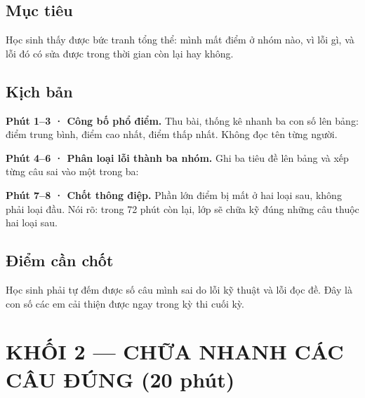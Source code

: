 \documentclass[11pt, a4paper]{article}
\begin{document}
\subsection{Mục tiêu}

Học sinh thấy được bức tranh tổng thể: mình mất điểm ở nhóm nào, vì lỗi gì, và lỗi đó có sửa được trong thời gian còn lại hay không.

\subsection{Kịch bản}

\textbf{Phút 1–3 · Công bố phổ điểm.} Thu bài, thống kê nhanh ba con số lên bảng: điểm trung bình, điểm cao nhất, điểm thấp nhất. Không đọc tên từng người.

\textbf{Phút 4–6 · Phân loại lỗi thành ba nhóm.} Ghi ba tiêu đề lên bảng và xếp từng câu sai vào một trong ba:


\textbf{Phút 7–8 · Chốt thông điệp.} Phần lớn điểm bị mất ở hai loại sau, không phải loại đầu. Nói rõ: trong 72 phút còn lại, lớp sẽ chữa kỹ đúng những câu thuộc hai loại sau.

\subsection{Điểm cần chốt}

Học sinh phải tự đếm được số câu mình sai do lỗi kỹ thuật và lỗi đọc đề. Đây là con số các em cải thiện được ngay trong kỳ thi cuối kỳ.

\section{KHỐI 2 — CHỮA NHANH CÁC CÂU ĐÚNG (20 phút)}
\end{document}
